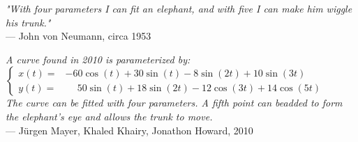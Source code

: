 \begin{flushright}
\emph{"With four parameters I can fit an elephant, and with five I can make him wiggle his trunk."}\\
— John von Neumann, circa 1953
\end{flushright}

\vspace{1.5em}


\vspace{1.5em}

\begin{flushright}
\emph{A curve found in 2010 is parameterized by:}\\[1ex]
$\left\lbrace
\begin{array}{rl}
x(t) = & -60 \cos(t) + 30 \sin(t) - 8 \sin(2t) + 10 \sin(3t) \\
y(t) = & \phantom{-}50 \sin(t) + 18 \sin(2t) - 12 \cos(3t) + 14 \cos(5t)
\end{array}
\right.$
\\[1ex]
\emph{The curve can be fitted with four parameters. A fifth point can beadded to form the elephant's eye and allows the trunk to move.}
\\
— Jürgen Mayer, Khaled Khairy, Jonathon Howard, 2010
\end{flushright}
